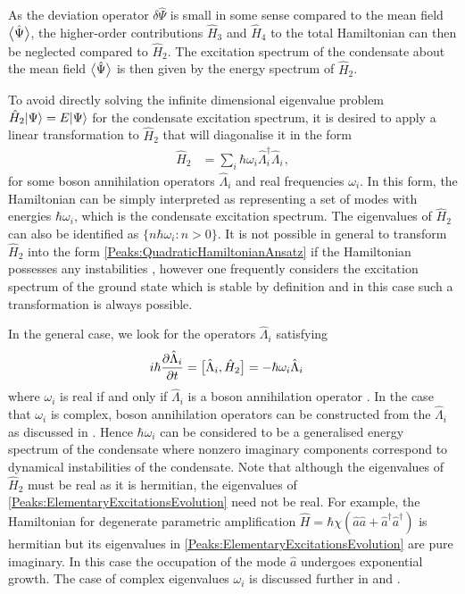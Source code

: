 As the deviation operator $\delta \hat{\Psi}$ is small in some sense compared to the mean field ${\big<\hat{\Psi}\big>}$, the higher-order contributions $\hat{H}_3$ and $\hat{H}_4$ to the total Hamiltonian can then be neglected compared to $\hat{H}_2$. The excitation spectrum of the condensate about the mean field ${\big<\hat{\Psi}\big>}$ is then given by the energy spectrum of $\hat{H}_2$.

To avoid directly solving the infinite dimensional eigenvalue problem $\hat{H}_2 {\left|\Psi\right>} = E {\left|\Psi\right>}$ for the condensate excitation spectrum, it is desired to apply a linear transformation to $\hat{H}_2$ that will diagonalise it in the form
\begin{align}
    \label{Peaks:QuadraticHamiltonianAnsatz}
    \hat{H}_2 &= \sum_i \hbar \omega_i \hat{\Lambda}_i^\dagger \hat{\Lambda}_i^{\phantom{\dagger}},
\end{align}
for some boson annihilation operators $\hat{\Lambda}_i$ and real frequencies $\omega_i$. In this form, the Hamiltonian can be simply interpreted as representing a set of modes with energies $\hbar \omega_i$, which is the condensate excitation spectrum. The eigenvalues of $\hat{H}_2$ can also be identified as $\{n \hbar \omega_i : n > 0 \}$. It is not possible in general to transform $\hat{H}_2$ into the form \eqref{Peaks:QuadraticHamiltonianAnsatz} if the Hamiltonian possesses any instabilities \citep{Leonhardt:2003}, however one frequently considers the excitation spectrum of the ground state which is stable by definition and in this case such a transformation is always possible.

In the general case, we look for the operators $\hat{\Lambda}_i$ satisfying
\begin{align}
    \label{Peaks:ElementaryExcitationsEvolution}
    i \hbar \frac{\partial \hat{\Lambda}_i}{\partial t} &= \comm{\hat{\Lambda}_i, \hat{H}_2 } = - \hbar \omega_i \hat{\Lambda}_i
\end{align}
where $\omega_i$ is real if and only if $\hat{\Lambda}_i$ is a boson annihilation operator \citep{Leonhardt:2003}. In the case that $\omega_i$ is complex, boson annihilation operators can be constructed from the $\hat{\Lambda}_i$ as discussed in . Hence $\hbar\omega_i$ can be considered to be a generalised energy spectrum of the condensate where nonzero imaginary components correspond to dynamical instabilities of the condensate. Note that although the eigenvalues of $\hat{H}_2$ must be real as it is hermitian, the eigenvalues of \eqref{Peaks:ElementaryExcitationsEvolution} need not be real. For example, the Hamiltonian for degenerate parametric amplification $\hat{H} = \hbar\chi \left(\hat{a}\hat{a} + \hat{a}^\dagger \hat{a}^\dagger \right)$ is hermitian but its eigenvalues in \eqref{Peaks:ElementaryExcitationsEvolution} are pure imaginary. In this case the occupation of the mode $\hat{a}$ undergoes exponential growth. The case of complex eigenvalues $\omega_i$ is discussed further in  and .

